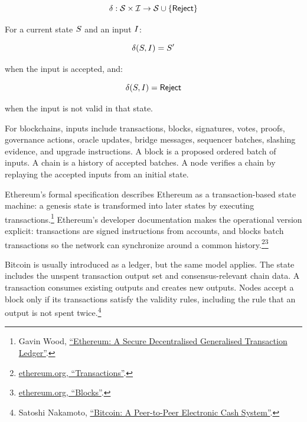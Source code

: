 \begin{definitionbox}

\[
\delta : \mathcal{S} \times \mathcal{I} \rightarrow \mathcal{S} \cup \{\mathsf{Reject}\}
\]

For a current state \(S\) and an input \(I\):

\[
\delta(S, I) = S'
\]

when the input is accepted, and:

\[
\delta(S, I) = \mathsf{Reject}
\]

when the input is not valid in that state.
\end{definitionbox}

For blockchains, inputs include transactions, blocks, signatures, votes, proofs, governance actions, oracle updates, bridge messages, sequencer batches, slashing evidence, and upgrade instructions. A block is a proposed ordered batch of inputs. A chain is a history of accepted batches. A node verifies a chain by replaying the accepted inputs from an initial state.

Ethereum's formal specification describes Ethereum as a transaction-based state machine: a genesis state is transformed into later states by executing transactions.\footnote{Gavin Wood, \href{https://ethereum.github.io/yellowpaper/paper.pdf}{``Ethereum: A Secure Decentralised Generalised Transaction Ledger''}.} Ethereum's developer documentation makes the operational version explicit: transactions are signed instructions from accounts, and blocks batch transactions so the network can synchronize around a common history.\footnote{\href{https://ethereum.org/developers/docs/transactions/}{ethereum.org, ``Transactions''}.}\footnote{\href{https://ethereum.org/developers/docs/blocks/}{ethereum.org, ``Blocks''}.}

Bitcoin is usually introduced as a ledger, but the same model applies. The state includes the unspent transaction output set and consensus-relevant chain data. A transaction consumes existing outputs and creates new outputs. Nodes accept a block only if its transactions satisfy the validity rules, including the rule that an output is not spent twice.\footnote{Satoshi Nakamoto, \href{https://bitcoin.org/bitcoin.pdf}{``Bitcoin: A Peer-to-Peer Electronic Cash System''}.}

